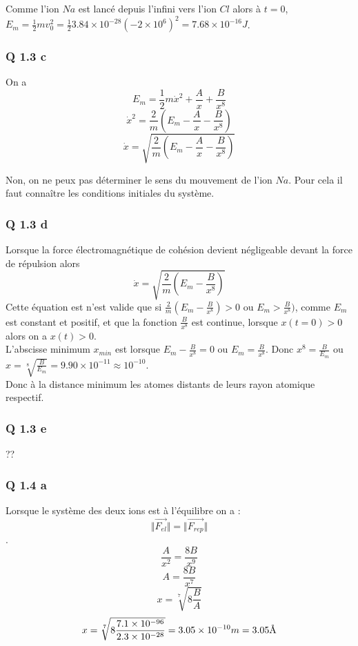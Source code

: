 \documentclass[]{book}
\theoremstyle{definition}
\begin{document}
Comme l'ion $Na$ est lanc\'e depuis l'infini vers l'ion $Cl$ alors \`a $t=0$, $E_m = \frac{1}{2}mv_0^2 = \frac{1}{2}3.84\times10^{-28}(-2\times10^6)^2 = 7.68\times10^{-16}J$.


\subsubsection*{Q 1.3 c}
On a 
$$E_m = \frac{1}{2}m\dot{x}^2 + \frac{A}{x} + \frac{B}{x^8}$$
$$\dot{x}^2 = \frac{2}{m}(E_m -\frac{A}{x} - \frac{B}{x^8})$$
$$\dot{x} = \sqrt{\frac{2}{m}(E_m -\frac{A}{x} - \frac{B}{x^8})}$$

Non, on ne peux pas d\'eterminer le sens du mouvement de l'ion $Na$. Pour cela il faut conna\^itre les conditions initiales du syst\`eme.\\

\subsubsection*{Q 1.3 d}
Lorsque la force \'electromagn\'etique de coh\'esion devient n\'egligeable devant la force de r\'epulsion alors 
$$\dot{x} = \sqrt{\frac{2}{m}(E_m - \frac{B}{x^8})}$$
Cette \'equation est n'est valide que si $\frac{2}{m}(E_m - \frac{B}{x^8}) > 0$ ou $E_m > \frac{B}{x^8})$, comme $E_m$ est constant et positif, et que la fonction $\frac{B}{x^8}$ est continue, lorsque $x(t=0) > 0$ alors on a $x(t) > 0$.\\

L'abscisse minimum $x_{min}$ est lorsque $E_m - \frac{B}{x^8} = 0$ ou $E_m = \frac{B}{x^8}$. Donc $x^8=\frac{B}{E_m}$ ou $x=\sqrt[8]{\frac{B}{E_m}} = 9.90\times10^{-11} \approx 10^{-10}$.\\

Donc \`a la distance minimum les atomes distants de leurs rayon atomique respectif. 

\subsubsection*{Q 1.3 e}
??

\subsubsection*{Q 1.4 a}
Lorsque le syst\`eme des deux ions est \`a l'\'equilibre on a :
$$\Vert \overrightarrow{F_{el}}\Vert = \Vert \overrightarrow{F_{rep}}\Vert$$.
$$\frac{A}{x^2} = \frac{8B}{x^9}$$
$$A = \frac{8B}{x^7}$$
$$x = \sqrt[7]{8\frac{B}{A}}$$
$$x = \sqrt[7]{8\frac{7.1\times10^{-96}}{2.3\times10^{-28}}} = 3.05\times10^{-10}m = 3.05 \textup{\AA}$$
\end{document}
